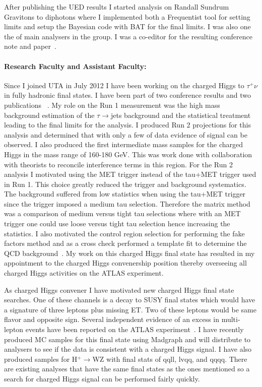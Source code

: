 \documentclass[11pt]{article}
\newcommand{\too}{$\rightarrow$}
\begin{document}
After publishing the UED results I started analysis on Randall Sundrum Gravitons to diphotons where I implemented both a Frequentist tool for setting limits and setup the Bayesian code with BAT for the final limits.  I was
also one the of main analysers in the group.  I was a co-editor for the resulting conference note and paper~\cite{atl1,atl1-conf}.

\paragraph{Research Faculty and Assistant Faculty:}Since I joined UTA in July 2012 I have been working on the charged Higgs to $\tau^+\nu$ in fully hadronic final states.  I have been part of two conference results and two publications ~\cite{hptnu,atl2014,taunu,hptnu1}.
My role on the Run 1 measurement was the high mass background estimation of the $\tau $\too jets background and the statistical treatment leading to the final 
limits for the analysis.  I produced Run 2 projections for this analysis and determined that with only a few \invfb of data evidence of signal can be observed.
I also produced the first intermediate mass samples for the charged Higgs in the mass range of 160-180 GeV.  This was work done with collaboration with theorists to reconcile interference terms in this region. 
For the Run 2 analysis I motivated using the MET trigger instead of the tau+MET trigger used in Run 1.  This choice greatly reduced the trigger and background systematics.  
The background suffered from low statistics when using the tau+MET trigger since the trigger imposed a medium tau selection.  Therefore the matrix method was a comparison
of medium versus tight tau selections where with an MET trigger one could use loose versus tight tau selection hence increasing the statistics.  I also motivated the control region selection
for performing the fake factors method and as a cross check performed a template fit to determine the QCD background~\cite{taunu,hptnu1}.
My work on this charged Higgs final state has resulted in my appointment to the charged Higgs convenership position thereby overseeing all charged Higgs activities on the ATLAS experiment.  

As charged Higgs convener I have motivated new charged Higgs final state searches.  One of these channels is a decay to SUSY final states which would have a signature of three leptons plus missing ET.  Two
of these leptons would be same flavor and opposite sign.  Several independent evidence of an excess in multi-lepton events have been reported on the ATLAS experiment~\cite{3lep}.  I have recently produced MC samples for this final state
using Madgraph and will distribute to analysers to see if the data is consistent with a charged Higgs signal. I have also produced samples for H$^+$\too WZ with final stats of qqll, lvqq, and qqqq.  There are existing analyses that have the same final states as the ones mentioned so a search for charged Higgs signal can be performed fairly quickly.
\end{document}
